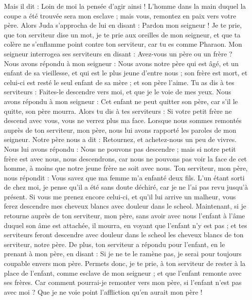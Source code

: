 \begin{multicols}{2}
Mais il dit : Loin de moi la pensée d’agir ainsi ! L’homme dans la main duquel la coupe a été trouvée sera mon esclave ; mais vous, remontez en paix vers votre père.
Alors Juda s'approcha de lui en disant : Pardon mon seigneur ! Je te prie, que ton serviteur dise un mot, je te prie aux oreilles de mon seigneur, et que ta colère ne s'enflamme point contre ton serviteur, car tu es comme Pharaon.
Mon seigneur interrogea ses serviteurs en disant : Avez-vous un père ou un frère ?
Nous avons répondu à mon seigneur : Nous avons notre père qui est âgé, et un enfant de sa vieillesse, et qui est le plus jeune d'entre nous ; son frère est mort, et celui-ci est resté le seul enfant  de sa mère ; et son père l'aime.
Tu as dis à tes serviteurs : Faites-le descendre vers moi, et que je le voie de mes yeux.
Nous avons répondu  à mon seigneur : Cet enfant ne peut quitter son père, car s'il le quitte, son père mourra.
Alors tu dis à tes serviteurs : Si votre petit frère ne descend avec vous, vous ne verrez plus ma face.
Lorsque nous sommes remontés auprès de ton serviteur, mon père, nous lui avons rapporté les paroles de mon seigneur.
Notre père nous a dit : Retournez, et achetez-nous un peu de vivres.
Nous lui avons répondu : Nous ne pouvons pas descendre ; mais si notre petit frère est avec nous, nous descendrons, car nous ne pouvons pas voir la face de cet homme, à moins que notre jeune frère ne soit avec nous.
Ton serviteur, mon père, nous répondit : Vous savez que ma femme m'a enfanté deux fils.
L’un étant sorti de chez moi, je pense qu’il a été sans doute déchiré, car je ne l’ai pas revu jusqu’à présent.
Si vous me prenez encore celui-ci, et qu’il lui arrive un malheur, vous ferez descendre mes cheveux blancs avec douleur dans le scheol.
Maintenant, si je retourne auprès de ton serviteur, mon père, sans avoir avec nous l’enfant à l’âme duquel son âme est attachée,
il mourra, en voyant que l’enfant n’y est pas ; et tes serviteurs feront descendre avec douleur dans le scheol les cheveux blancs de ton serviteur, notre père.
De plus, ton serviteur a répondu pour l'enfant, en le prenant à mon père, en disant : Si je ne te le ramène pas, je serai pour toujours coupable envers mon père.
Permets donc, je te prie, à ton serviteur de rester à la place de l’enfant, comme esclave de mon seigneur ; et que l’enfant remonte avec ses frères.
Car comment pourrai-je remonter vers mon père, si l'enfant n'est pas avec moi ? Que je ne voie point l'affliction qu'en aurait mon père !

\end{multicols}
